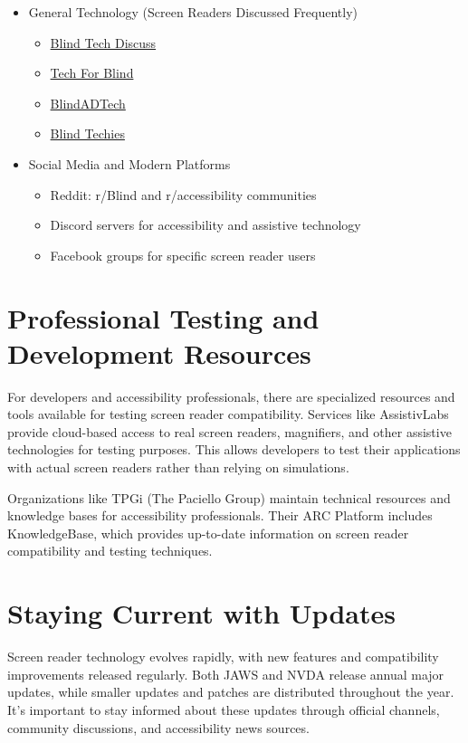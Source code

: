 \begin{itemize}
 \item General Technology (Screen Readers Discussed Frequently)
 \begin{itemize}
 \item \href{https://groups.io/g/blindtechdiscuss/}{Blind Tech Discuss}
 \item \href{https://groups.io/g/tech-for-blind}{Tech For Blind}
 \item \href{https://groups.io/g/blindadtech}{BlindADTech}
 \item \href{https://groups.io/g/blind-techies/}{Blind Techies}
 \end{itemize}
 \item Social Media and Modern Platforms
 \begin{itemize}
 \item Reddit: r/Blind and r/accessibility communities
 \item Discord servers for accessibility and assistive technology
 \item Facebook groups for specific screen reader users
 \end{itemize}
\end{itemize}

\section{Professional Testing and Development Resources}\label{testing}
For developers and accessibility professionals, there are specialized resources and tools available for testing screen reader compatibility. Services like AssistivLabs provide cloud-based access to real screen readers, magnifiers, and other assistive technologies for testing purposes. This allows developers to test their applications with actual screen readers rather than relying on simulations.

Organizations like TPGi (The Paciello Group) maintain technical resources and knowledge bases for accessibility professionals. Their ARC Platform includes KnowledgeBase, which provides up-to-date information on screen reader compatibility and testing techniques.

\section{Staying Current with Updates}\label{updates}
Screen reader technology evolves rapidly, with new features and compatibility improvements released regularly. Both JAWS and NVDA release annual major updates, while smaller updates and patches are distributed throughout the year. It's important to stay informed about these updates through official channels, community discussions, and accessibility news sources.

